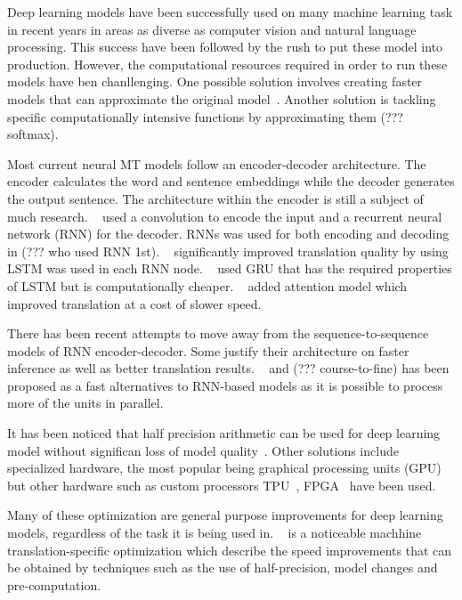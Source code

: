 \documentclass[11pt,a4paper]{article}
\begin{document}
Deep learning models have been successfully used on many machine learning task in recent years in areas as diverse as computer vision and natural language processing. This success have been followed by the rush to put these model into production. However, the computational resources required in order to run these models have ben chanllenging. One possible solution involves creating faster models that can approximate the original model~\citep{DBLP:conf/emnlp/KimR16}. Another solution is tackling specific computationally intensive functions by approximating them (??? softmax). 

Most current neural MT models follow an encoder-decoder architecture. The encoder calculates the word and sentence embeddings while the decoder generates the output sentence. The architecture within the encoder is still a subject of much research. ~\cite{kalchbrenner13emnlp} used a convolution to encode the input and a recurrent neural network (RNN) for the decoder. RNNs was used for both encoding and decoding in (??? who used RNN 1st). ~\cite{Sutskever:2014:SSL:2969033.2969173} significantly improved translation quality by using LSTM was used in each RNN node. ~\cite{D14-1179} used GRU that has the required properties of LSTM but is computationally cheaper. ~\cite{DBLP:journals/corr/BahdanauCB14} added attention model which improved translation at a cost of slower speed.

There has been recent attempts to move away from the sequence-to-sequence models of RNN encoder-decoder. Some justify their architecture on faster inference as well as better translation results. ~\cite{DBLP:journals/corr/VaswaniSPUJGKP17} and (??? course-to-fine) has been proposed as a fast alternatives to RNN-based models as it is possible to process more of the units in parallel.

It has been noticed that half precision arithmetic can be used for deep learning model without significan loss of model quality~\citep{DBLP:journals/corr/abs-1710-03740}. Other solutions include specialized hardware, the most popular being graphical processing units (GPU) but other hardware such as custom processors TPU~\citep{DBLP:journals/corr/JouppiYPPABBBBB17}, FPGA~\citep{DBLP:journals/corr/LaceyTA16} have been used. 

Many of these optimization are general purpose improvements for deep learning models, regardless of the task it is being used in. ~\cite{DBLP:conf/emnlp/Devlin17} is a noticeable machhine translation-specific optimization which describe the speed improvements that can be obtained by techniques such as the use of half-precision, model changes and pre-computation.
\end{document}
